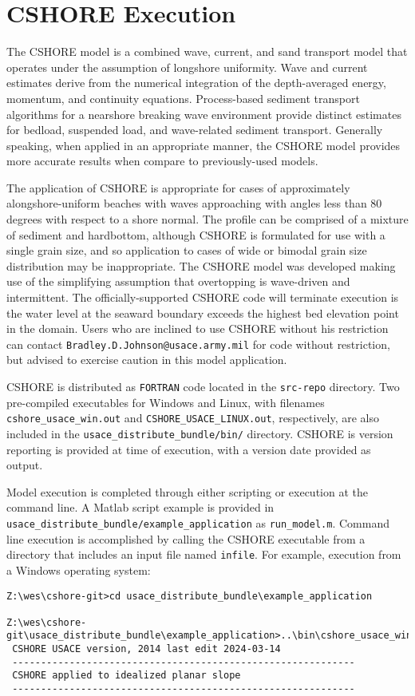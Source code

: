 \documentclass[11pt,oneside]{book}
\begin{document}
\section*{CSHORE Execution}
The CSHORE model is a combined wave, current, and sand transport model
that operates under the assumption of longshore uniformity.  Wave and
current estimates derive from the numerical integration of the
depth-averaged energy, momentum, and continuity equations.
Process-based sediment transport algorithms for a nearshore breaking
wave environment provide distinct estimates for bedload, suspended
load, and wave-related sediment transport.  Generally speaking, when
applied in an appropriate manner, the CSHORE model provides more
accurate results when compare to previously-used models.

The application of CSHORE is appropriate for cases of approximately
alongshore-uniform beaches with waves approaching with angles less
than 80 degrees with respect to a shore normal.  The profile can be
comprised of a mixture of sediment and hardbottom, although CSHORE is
formulated for use with a single grain size, and so application to
cases of wide or bimodal grain size distribution may be
inappropriate. The CSHORE model was developed making use of the
simplifying assumption that overtopping is wave-driven and
intermittent.  The officially-supported CSHORE code will terminate
execution is the water level at the seaward boundary exceeds the
highest bed elevation point in the domain.  Users who are inclined to
use CSHORE without his restriction can contact
\verb+Bradley.D.Johnson@usace.army.mil+ for code without restriction, but
advised to exercise caution in this model application.




CSHORE is distributed as \verb+FORTRAN+ code located in the
\verb+src-repo+ directory.  Two pre-compiled executables for Windows
and Linux, with filenames \verb+cshore_usace_win.out+ and
\verb+CSHORE_USACE_LINUX.out+, respectively, are also included in the
\verb+usace_distribute_bundle/bin/+ directory.  CSHORE is version
reporting is provided at time of execution, with a version date provided as output.

Model execution is completed through either scripting or execution at
the command line.  A Matlab script example is provided in
\verb+usace_distribute_bundle/example_application+ as
\verb+run_model.m+.  Command line execution is accomplished by calling
the CSHORE executable from a directory that includes an input file
named \verb+infile+.  For example, execution from a Windows operating system:
\begin{verbatim}
Z:\wes\cshore-git>cd usace_distribute_bundle\example_application

Z:\wes\cshore-git\usace_distribute_bundle\example_application>..\bin\cshore_usace_win.out
 CSHORE USACE version, 2014 last edit 2024-03-14
 ------------------------------------------------------------
 CSHORE applied to idealized planar slope
 ------------------------------------------------------------
\end{verbatim}
\end{document}
